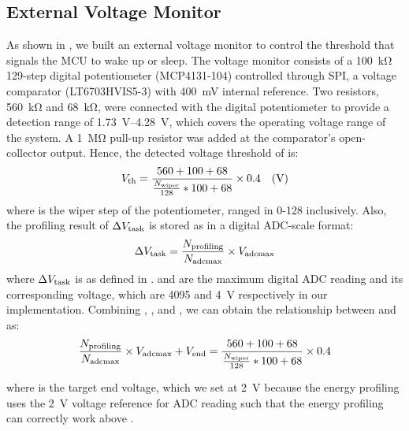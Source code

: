\subsection{External Voltage Monitor}

As shown in , we built an external voltage monitor to control the threshold that signals the MCU to wake up or sleep. 
The voltage monitor consists of a \SI{100}{\kilo\ohm} 129-step digital potentiometer (MCP4131-104) controlled through SPI, a voltage comparator (LT6703HVIS5-3) with \SI{400}{\milli\volt} internal reference. 
Two resistors, \SI{560}{\kilo\ohm} and \SI{68}{\kilo\ohm}, were connected with the digital potentiometer to provide a detection range of \SIrange{1.73}{4.28}{\volt}, which covers the operating voltage range of the system. 
A \SI{1}{\mega\ohm} pull-up resistor was added at the comparator's open-collector output.
Hence, the detected voltage threshold of  is:
\begin{equation}
    V_{\text{th}} = \frac{560 + 100 + 68}{\frac{N_{\text{wiper}}}{128} * 100 + 68} \times 0.4 \quad(\SI{}{\volt})
    \label{eq:pot_thr}
\end{equation}
where  is the wiper step of the potentiometer, ranged in 0-128 inclusively. 
Also, the profiling result of $\Delta V_{\text{task}}$ is stored as  in a digital ADC-scale format:
\begin{equation}
    \Delta V_{\text{task}} = \frac{N_{\text{profiling}}}{N_{\text{adcmax}}} \times V_{\text{adcmax}} 
    \label{eq:digit_profiling_result}
\end{equation}
where $\Delta V_{\text{task}}$ is as defined in .  and  are the maximum digital ADC reading and its corresponding voltage, which are 4095 and \SI{4}{\volt} respectively in our implementation.
Combining , , and , we can obtain the relationship between  and  as:
\begin{equation}
    \frac{N_{\text{profiling}}}{N_{\text{adcmax}}} \times V_{\text{adcmax}} + V_{\text{end}} = \frac{560 + 100 + 68}{\frac{N_{\text{wiper}}}{128} * 100 + 68} \times 0.4
    \label{eq:adc_thr}
\end{equation}

where  is the target end voltage, which we set at \SI{2}{\volt} because the energy profiling  uses the \SI{2}{\volt} voltage reference for ADC reading such that the energy profiling can correctly work above . 

